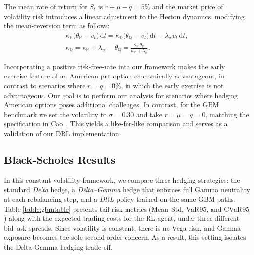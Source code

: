 \documentclass[a4paper,fleqn]{cas-dc}
\begin{document}
The mean rate of return for $S_t$ is $r+\mu-q=5\%$ and the market price of volatility risk introduces a linear adjustment to the Heston dynamics, modifying the mean-reversion term as follows:
\[
\begin{gathered}
\kappa_{\mathbb{P}}\bigl(\theta_{\mathbb{P}} - v_t\bigr)\,\mathrm{d}t
= \kappa_{\mathbb{Q}}\bigl(\theta_{\mathbb{Q}} - v_t\bigr)\,\mathrm{d}t
- \lambda_v\,v_t\,\mathrm{d}t,\\[6pt]
\kappa_{\mathbb{Q}}
= \kappa_{\mathbb{P}} + \lambda_v,
\quad
\theta_{\mathbb{Q}}
= \frac{\kappa_{\mathbb{P}}\,\theta_{\mathbb{P}}}
{\kappa_{\mathbb{P}} + \lambda_v}\,.
\end{gathered}
\]

Incorporating a positive risk-free-rate into our framework makes the early exercise feature of an American put option economically advantageous, in contrast to scenarios where $r=q=0\%$, in which the early exercise is not advantageous. Our goal is to perform our analysis for scenarios where hedging American options poses additional challenges. In contrast, for the GBM benchmark we set the volatility to $\sigma=0.30$ and take $r=\mu=q=0$, matching the specification in Cao~\cite{DH_1}. This yields a like‑for‑like comparison and serves as a validation of our DRL implementation.

\subsection{Black-Scholes Results}
In this constant-volatility framework, we compare three hedging strategies: the standard \textit{Delta} hedge, a \textit{Delta--Gamma} hedge that enforces full Gamma neutrality at each rebalancing step, and a \textit{DRL} policy trained on the same GBM paths. Table \ref{table:gbmtable} presents tail-risk metrics (Mean–Std, $\text{VaR}{95}$, and $\text{CVaR}{95}$) along with the expected trading costs for the RL agent, under three different bid–ask spreads. Since volatility is constant, there is no Vega risk, and Gamma exposure becomes the sole second-order concern. As a result, this setting isolates the Delta-Gamma hedging trade-off.
\end{document}
